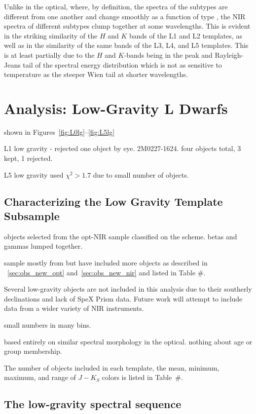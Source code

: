 \documentclass[12pt,preprint]{aastex}
\begin{document}
Unlike in the optical, where, by definition, the spectra of the subtypes are different from one another and change smoothly as a function of type \citep{Kirkpatrick05}, the NIR spectra of different subtypes clump together at some wavelengths.
This is evident in the striking similarity of the $H$ and $K$ bands of the L1 and L2 templates, as well as in the similarity of the same bands of the L3, L4, and L5 templates.
This is at least partially due to the $H$ and $K$-bands being in the peak and Rayleigh-Jeans tail of the spectral energy distribution which is not as sensitive to temperature as the steeper Wien tail at shorter wavelengths.

\section{Analysis: Low-Gravity L Dwarfs}
\label{sec:lowg}

shown in Figures~\ref{fig:L0lg}--\ref{fig:L5lg}

L1 low gravity - rejected one object by eye. 2M0227-1624. four objects total, 3 kept, 1 rejected.

L5 low gravity used $\chi^2 > 1.7$ due to small number of objects.

\subsection{Characterizing the Low Gravity Template Subsample}
\label{sec:templates_lowg}

objects selected from the opt-NIR sample classified on the \citet{Cruz09_lowg} scheme. betas and gammas lumped together.

sample mostly from \citet{Cruz09_lowg} but have included more objects as described in \SS~\ref{sec:obs_new_opt} and~\ref{sec:obs_new_nir} and listed in Table \#.

Several low-gravity objects are not included in this analysis due to their southerly declinations and lack of SpeX Prism data. Future work will attempt to include data from a wider variety of NIR instruments.

small numbers in many bins.

based entirely on similar spectral morphology in the optical. nothing about age or group membership.

The number of objects included in each template, the mean, minimum, maximum, and range of $J-K_S$ colors is listed in Table~\#. 

\subsection{The low-gravity spectral sequence}
\end{document}
